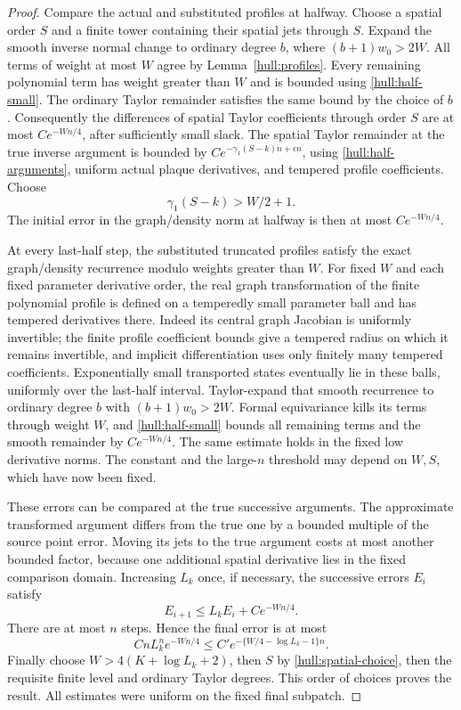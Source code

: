 \begin{proof}
Compare the actual and substituted profiles at halfway. Choose a
spatial order $S$ and a finite tower containing their spatial jets
through $S$. Expand the smooth inverse normal change to ordinary
degree $b$, where $(b+1)w_0>2W$. All terms of weight at most $W$
agree by Lemma~\ref{hull:profiles}. Every remaining polynomial term
has weight greater than $W$ and is bounded using
\eqref{hull:half-small}. The ordinary Taylor remainder satisfies
the same bound by the choice of $b$. Consequently the differences
of spatial Taylor coefficients through order $S$ are at most
$C e^{-Wn/4}$, after sufficiently small slack.
The spatial Taylor remainder at the true inverse argument is bounded
by $C e^{-\gamma_1(S-k)n+\epsilon n}$, using
\eqref{hull:half-arguments}, uniform actual plaque derivatives, and
tempered profile coefficients. Choose
\begin{equation}\label{hull:spatial-choice}
 \gamma_1(S-k)>W/2+1.
\end{equation}
The initial error in the graph/density norm at halfway is then at most
$C e^{-Wn/4}$.

At every last-half step, the substituted truncated profiles satisfy
the exact graph/density recurrence modulo weights greater than $W$.
For fixed $W$ and each fixed parameter derivative order, the real
graph transformation of the finite polynomial profile is defined on
a temperedly small parameter ball and has tempered derivatives there.
Indeed its central graph Jacobian is uniformly invertible; the finite
profile coefficient bounds give a tempered radius on which it remains
invertible, and implicit differentiation uses only finitely many
tempered coefficients. Exponentially small transported states
eventually lie in these balls, uniformly over the last-half interval.
Taylor-expand that smooth recurrence to ordinary degree $b$ with
$(b+1)w_0>2W$. Formal equivariance kills its terms through weight
$W$, and \eqref{hull:half-small} bounds all remaining terms and the
smooth remainder by $C e^{-Wn/4}$. The same estimate holds in the
fixed low derivative norms. The constant and the large-$n$ threshold
may depend on $W,S$, which have now been fixed.

These errors can be compared at the true successive arguments.
The approximate transformed argument differs from the true one by
a bounded multiple of the source point error. Moving its jets to the
true argument costs at most another bounded factor, because one
additional spatial derivative lies in the fixed comparison domain.
Increasing $L_k$ once, if necessary, the successive errors $E_i$
satisfy
\[
 E_{i+1}\le L_k E_i+C e^{-Wn/4}.
\]
There are at most $n$ steps. Hence the final error is at most
\begin{equation}\label{hull:actual-error}
 C n L_k^n e^{-Wn/4}
 \le C' e^{-\{W/4-\log L_k-1\}n}.
\end{equation}
Finally choose $W>4(K+\log L_k+2)$, then $S$ by
\eqref{hull:spatial-choice}, then the requisite finite level and
ordinary Taylor degrees. This order of choices proves the result.
All estimates were uniform on the fixed final subpatch.
\end{proof}

